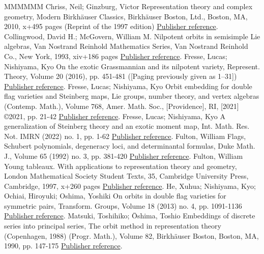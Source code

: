 \documentclass[11pt]{article}
\theoremstyle{definition}
\numberwithin{equation}{section}
\begin{document}
\begin{thebibliography}{MMMMMM}
 Chriss, Neil; Ginzburg, Victor Representation theory and complex geometry, Modern Birkhäuser Classics, Birkhäuser Boston, Ltd., Boston, MA, 2010, x+495 pages (Reprint of the 1997 edition) \href{https://alco.centre-mersenne.org/articles/10.5802/alco.245/#CG}{Publisher reference}.
 Collingwood, David H.; McGovern, William M. Nilpotent orbits in semisimple Lie algebras, Van Nostrand Reinhold Mathematics Series, Van Nostrand Reinhold Co., New York, 1993, xiv+186 pages \href{https://alco.centre-mersenne.org/articles/10.5802/alco.245/#Collingwood-McGovern}{Publisher reference}.
 Fresse, Lucas; Nishiyama, Kyo On the exotic Grassmannian and its nilpotent variety, Represent. Theory, Volume 20 (2016), pp. 451-481 ([Paging previously given as 1–31]) \href{https://alco.centre-mersenne.org/articles/10.5802/alco.245/#FN1}{Publisher reference}.
 Fresse, Lucas; Nishiyama, Kyo Orbit embedding for double flag varieties and Steinberg maps, Lie groups, number theory, and vertex algebras (Contemp. Math.), Volume 768, Amer. Math. Soc., [Providence], RI, [2021] ©2021, pp. 21-42 \href{https://alco.centre-mersenne.org/articles/10.5802/alco.245/#FN3}{Publisher reference}.
 Fresse, Lucas; Nishiyama, Kyo A generalization of Steinberg theory and an exotic moment map, Int. Math. Res. Not. IMRN (2022) no. 1, pp. 1-62 \href{https://alco.centre-mersenne.org/articles/10.5802/alco.245/#FN2}{Publisher reference}.
 Fulton, William Flags, Schubert polynomials, degeneracy loci, and determinantal formulas, Duke Math. J., Volume 65 (1992) no. 3, pp. 381-420 \href{https://alco.centre-mersenne.org/articles/10.5802/alco.245/#Fulton-1991}{Publisher reference}.
 Fulton, William Young tableaux. With applications to representation theory and geometry, London Mathematical Society Student Texts, 35, Cambridge University Press, Cambridge, 1997, x+260 pages \href{https://alco.centre-mersenne.org/articles/10.5802/alco.245/#Fulton}{Publisher reference}.
 He, Xuhua; Nishiyama, Kyo; Ochiai, Hiroyuki; Oshima, Yoshiki On orbits in double flag varieties for symmetric pairs, Transform. Groups, Volume 18 (2013) no. 4, pp. 1091-1136 \href{https://alco.centre-mersenne.org/articles/10.5802/alco.245/#HNOO}{Publisher reference}.
 Matsuki, Toshihiko; Ōshima, Toshio Embeddings of discrete series into principal series, The orbit method in representation theory (Copenhagen, 1988) (Progr. Math.), Volume 82, Birkhäuser Boston, Boston, MA, 1990, pp. 147-175 \href{https://alco.centre-mersenne.org/articles/10.5802/alco.245/#Matsuki-Oshima}{Publisher reference}.

\end{thebibliography}
\end{document}
